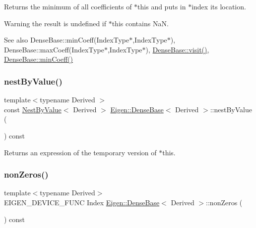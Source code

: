 \begin{DoxyReturn}{Returns}
the minimum of all coefficients of $\ast$this and puts in $\ast$index its location. 
\end{DoxyReturn}
\begin{DoxyWarning}{Warning}
the result is undefined if {\ttfamily $\ast$this} contains NaN.
\end{DoxyWarning}
\begin{DoxySeeAlso}{See also}
Dense\+Base\+::min\+Coeff(\+Index\+Type$\ast$,\+Index\+Type$\ast$), Dense\+Base\+::max\+Coeff(\+Index\+Type$\ast$,\+Index\+Type$\ast$), \mbox{\hyperlink{class_eigen_1_1_dense_base_a7f73df3954a09c7ab0dca208b6b23ddd}{Dense\+Base\+::visit()}}, \mbox{\hyperlink{class_eigen_1_1_dense_base_a6634944be3d4fef551b57ffad30467f2}{Dense\+Base\+::min\+Coeff()}} 
\end{DoxySeeAlso}
\mbox{\label{class_eigen_1_1_dense_base_a3e2761e2b6da74dba1d17b40cc918bf7}} 
\subsubsection{\texorpdfstring{nestByValue()}{nestByValue()}}
{\footnotesize\ttfamily template$<$typename Derived $>$ \\
const \mbox{\hyperlink{class_eigen_1_1_nest_by_value}{Nest\+By\+Value}}$<$ Derived $>$ \mbox{\hyperlink{class_eigen_1_1_dense_base}{Eigen\+::\+Dense\+Base}}$<$ Derived $>$\+::nest\+By\+Value (\begin{DoxyParamCaption}{ }\end{DoxyParamCaption}) const\hspace{0.3cm}{\ttfamily [inline]}}

\begin{DoxyReturn}{Returns}
an expression of the temporary version of $\ast$this. 
\end{DoxyReturn}
\mbox{\label{class_eigen_1_1_dense_base_ad5c2c3a2cfa0bb931dcc0743b9f57882}} 
\subsubsection{\texorpdfstring{nonZeros()}{nonZeros()}}
{\footnotesize\ttfamily template$<$typename Derived$>$ \\
E\+I\+G\+E\+N\+\_\+\+D\+E\+V\+I\+C\+E\+\_\+\+F\+U\+NC Index \mbox{\hyperlink{class_eigen_1_1_dense_base}{Eigen\+::\+Dense\+Base}}$<$ Derived $>$\+::non\+Zeros (\begin{DoxyParamCaption}{ }\end{DoxyParamCaption}) const\hspace{0.3cm}{\ttfamily [inline]}}

